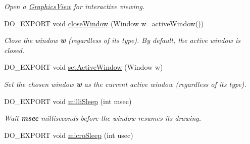\begin{DoxyCompactItemize}
\begin{DoxyCompactList}\small\item\em Open a \hyperlink{class_d_o_1_1_graphics_view}{Graphics\-View} for interactive viewing. \end{DoxyCompactList}\item 
\hypertarget{group___window_management_ga3e25bff90d6edbfd1c84b78e4f8e413f}{D\-O\-\_\-\-E\-X\-P\-O\-R\-T void \hyperlink{group___window_management_ga3e25bff90d6edbfd1c84b78e4f8e413f}{close\-Window} (Window w=active\-Window())}\label{group___window_management_ga3e25bff90d6edbfd1c84b78e4f8e413f}

\begin{DoxyCompactList}\small\item\em Close the window {\bfseries w} (regardless of its type). By default, the active window is closed. \end{DoxyCompactList}\item 
\hypertarget{group___window_management_ga7f5c45f54f7b8e9d300a45ee3d33d95e}{D\-O\-\_\-\-E\-X\-P\-O\-R\-T void \hyperlink{group___window_management_ga7f5c45f54f7b8e9d300a45ee3d33d95e}{set\-Active\-Window} (Window w)}\label{group___window_management_ga7f5c45f54f7b8e9d300a45ee3d33d95e}

\begin{DoxyCompactList}\small\item\em Set the chosen window {\bfseries w} as the current active window (regardless of its type). \end{DoxyCompactList}\item 
\hypertarget{group___window_management_ga1f4b17862a64245cfc8615ee2815b064}{D\-O\-\_\-\-E\-X\-P\-O\-R\-T void \hyperlink{group___window_management_ga1f4b17862a64245cfc8615ee2815b064}{milli\-Sleep} (int msec)}\label{group___window_management_ga1f4b17862a64245cfc8615ee2815b064}

\begin{DoxyCompactList}\small\item\em Wait {\bfseries msec} milliseconds before the window resumes its drawing. \end{DoxyCompactList}\item 
\hypertarget{group___window_management_gad2a382b821da01b199aa816d087cd265}{D\-O\-\_\-\-E\-X\-P\-O\-R\-T void \hyperlink{group___window_management_gad2a382b821da01b199aa816d087cd265}{micro\-Sleep} (int usec)}\label{group___window_management_gad2a382b821da01b199aa816d087cd265}


\end{DoxyCompactItemize}

